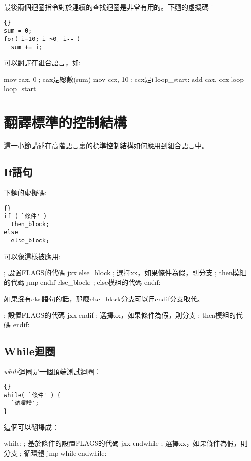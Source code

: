 最後兩個迴圈指令對於連續的查找迴圈是非常有用的。下麵的虛擬碼：
\begin{lstlisting}[stepnumber=0]{}
sum = 0;
for( i=10; i >0; i-- )
  sum += i;
\end{lstlisting}
\noindent 可以翻譯在組合語言，如:
\begin{AsmCodeListing}[frame=none]
      mov    eax, 0          ; eax是總數(sum)
      mov    ecx, 10         ; ecx是i
loop_start:
      add    eax, ecx
      loop   loop_start
\end{AsmCodeListing}

\section{翻譯標準的控制結構}

這一小節講述在高階語言裏的標準控制結構如何應用到組合語言中。

\subsection{If語句 }
下麵的虛擬碼:
\lstset{escapeinside=`',language=Pascal,%
}
\begin{lstlisting}[stepnumber=0]{}
if ( `條件' )
  then_block;
else
  else_block;
\end{lstlisting}
\noindent 可以像這樣被應用:
\begin{AsmCodeListing}[frame=none]
      ; 設置FLAGS的代碼
      jxx    else_block    ; 選擇xx，如果條件為假，則分支
      ; then模組的代碼
      jmp    endif
else_block:
      ; else模組的代碼
endif:
\end{AsmCodeListing}

如果沒有else語句的話，那麼{\code else\_block}分支可以用{\code endif}分支取代。
\begin{AsmCodeListing}[frame=none]
      ; 設置FLAGS的代碼
      jxx    endif          ; 選擇xx，如果條件為假，則分支
      ; then模組的代碼
endif:
\end{AsmCodeListing}

\subsection{While迴圈}
\emph{while}迴圈是一個頂端測試迴圈：
\lstset{escapeinside=`',language=Pascal,%
}
\begin{lstlisting}[stepnumber=0]{}
while( `條件' ) {
  `循環體';
}
\end{lstlisting}
\noindent 這個可以翻譯成：
\begin{AsmCodeListing}[frame=none]
while:
      ; 基於條件的設置FLAGS的代碼
      jxx    endwhile       ; 選擇xx，如果條件為假，則分支
      ; 循環體
      jmp    while
endwhile:
\end{AsmCodeListing}

